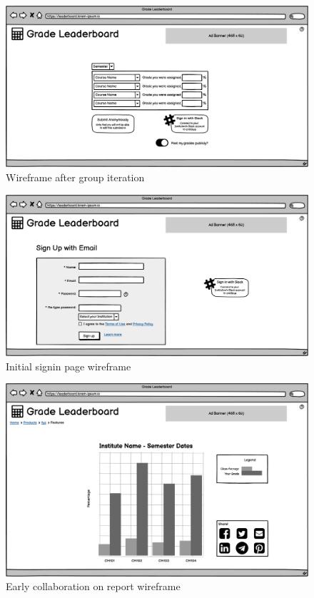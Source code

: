 \begin{figure}[H]
    \centering
    \includegraphics[width=\textwidth]{images/Initial Page v07.png}
    \caption{Wireframe after group iteration}
    \label{fig:modifiedwireframe}
\end{figure}
\begin{figure}[H]
    \centering
    \includegraphics[width=\textwidth]{images/Sign in Page v07.png}
    \caption{Initial signin page wireframe}
    \label{fig:signinwireframe}
\end{figure}
\begin{figure}[H]
    \centering
    \includegraphics[width=\textwidth]{images/Full semester - class averages chart 1 v07.png}
    \caption{Early collaboration on report wireframe}
    \label{fig:earlyreportwireframe}
\end{figure}
